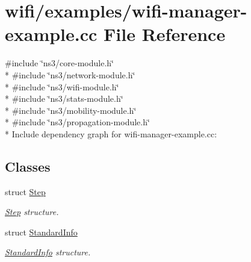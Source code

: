 \hypertarget{wifi-manager-example_8cc}{}\section{wifi/examples/wifi-\/manager-\/example.cc File Reference}
\label{wifi-manager-example_8cc}
{\ttfamily \#include \char`\"{}ns3/core-\/module.\+h\char`\"{}}\\*
{\ttfamily \#include \char`\"{}ns3/network-\/module.\+h\char`\"{}}\\*
{\ttfamily \#include \char`\"{}ns3/wifi-\/module.\+h\char`\"{}}\\*
{\ttfamily \#include \char`\"{}ns3/stats-\/module.\+h\char`\"{}}\\*
{\ttfamily \#include \char`\"{}ns3/mobility-\/module.\+h\char`\"{}}\\*
{\ttfamily \#include \char`\"{}ns3/propagation-\/module.\+h\char`\"{}}\\*
Include dependency graph for wifi-\/manager-\/example.cc\+:
\subsection*{Classes}
\begin{DoxyCompactItemize}
\item 
struct \hyperlink{structStep}{Step}
\begin{DoxyCompactList}\small\item\em \hyperlink{structStep}{Step} structure. \end{DoxyCompactList}\item 
struct \hyperlink{structStandardInfo}{Standard\+Info}
\begin{DoxyCompactList}\small\item\em \hyperlink{structStandardInfo}{Standard\+Info} structure. \end{DoxyCompactList}\end{DoxyCompactItemize}
